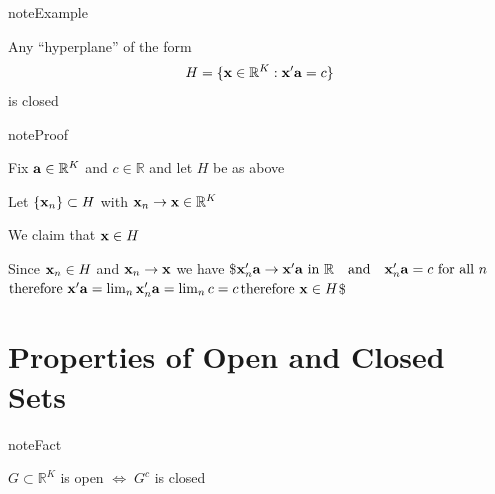 \documentclass[letterpaper,10pt,english]{jupyterBook}
\begin{document}
\begin{sphinxadmonition}{note}{Example}

\sphinxAtStartPar
Any “hyperplane” of the form
\begin{equation*}
\begin{split}
H = \{ {\bf x} \in \mathbb{R}^K : {\bf x}' {\bf a} = c \}
\end{split}
\end{equation*}
\sphinxAtStartPar
is closed
\end{sphinxadmonition}

\begin{sphinxadmonition}{note}{Proof}

\sphinxAtStartPar
Fix \({\bf a} \in \mathbb{R}^K\) and \(c \in \mathbb{R}\) and let \(H\) be as above

\sphinxAtStartPar
Let \(\{{\bf x}_n\} \subset H\) with \({\bf x}_n \to {\bf x} \in \mathbb{R}^K\)

\sphinxAtStartPar
We claim that \({\bf x} \in H\)

\sphinxAtStartPar
Since \({\bf x}_n \in H\) and \({\bf x}_n \to {\bf x}\) we have
\$\(
{\bf x}_n ' {\bf a} \to {\bf x}' {\bf a} \text{ in } \mathbb{R}
\quad \text{and} \quad
{\bf x}_n' {\bf a} = c \text{ for all } n
\)\(
\)\(
\text{therefore } 
{\bf x}' {\bf a} = \lim_{n} {\bf x}_n' {\bf a} 
= \lim_n c
= c
\)\(
\)\(
\text{therefore } 
{\bf x} \in H
\)\$
\end{sphinxadmonition}


\section{Properties of Open and Closed Sets}
\label{\detokenize{04.basic_analysis:properties-of-open-and-closed-sets}}
\begin{sphinxadmonition}{note}{Fact}

\sphinxAtStartPar
\(G \subset \mathbb{R}^K\) is open \(\iff \; G^c\) is closed
\end{sphinxadmonition}
\end{document}
